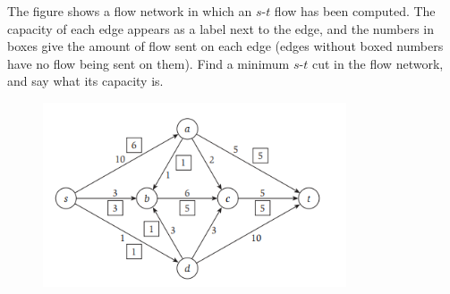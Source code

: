 \problem{}
The figure shows a flow network in which an $s$-$t$ flow has been computed. The capacity of each edge appears as a label next to the edge, and the numbers in boxes give the amount of flow sent on each edge (edges without boxed numbers have no flow being sent on them).
Find a minimum $s$-$t$ cut in the flow network, and say what its capacity is.
\begin{figure}[htbp]
    \centering
    \includegraphics[width=0.8\textwidth]{6.png}
    \end{figure} 

\solution{

}

\newpage
